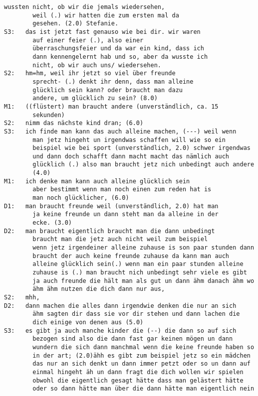 \begin{lstlisting}[language={}]
        wussten nicht, ob wir die jemals wiedersehen, 
        weil (.) wir hatten die zum ersten mal da 
        gesehen. (2.0) Stefanie.
S3:   das ist jetzt fast genauso wie bei dir. wir waren 
        auf einer feier (.), also einer 
        überraschungsfeier und da war ein kind, dass ich 
        dann kennengelernt hab und so, aber da wusste ich 
        nicht, ob wir auch uns/ wiedersehen. 
S2:   hm=hm, weil ihr jetzt so viel über freunde 
        sprecht- (.) denkt ihr denn, dass man alleine
        glücklich sein kann? oder braucht man dazu 
        andere, um glücklich zu sein? (8.0)
M1:   ((flüstert) man braucht andere (unverständlich, ca. 15 
        sekunden)
S2:   nimm das nächste kind dran; (6.0)
S3:   ich finde man kann das auch alleine machen, (---) weil wenn 
        man jetz hingeht un irgendwas schaffen will wie so ein 
        beispiel wie bei sport (unverständlich, 2.0) schwer irgendwas 
        und dann doch schafft dann macht macht das nämlich auch 
        glücklich (.) also man braucht jetz nich unbedingt auch andere 
        (4.0)
M1:   ich denke man kann auch alleine glücklich sein              
        aber bestimmt wenn man noch einen zum reden hat is
        man noch glücklicher, (6.0)
D1:   man braucht freunde weil (unverständlich, 2.0) hat man      
        ja keine freunde un dann steht man da alleine in der
        ecke. (3.0)
D2:   man braucht eigentlich braucht man die dann unbedingt 
        braucht man die jetz auch nicht weil zum beispiel
        wenn jetz irgendeiner alleine zuhause is son paar stunden dann 
        braucht der auch keine freunde zuhause da kann man auch 
        alleine glücklich sein(.) wenn man ein paar stunden alleine 
        zuhause is (.) man braucht nich unbedingt sehr viele es gibt 
        ja auch freunde die hält man als gut un dann ähm danach ähm wo 
        ähm ähm nutzen die dich dann nur aus,
S2:   mhh,
D2:   dann machen die alles dann irgendwie denken die nur an sich 
        ähm sagten dir dass sie vor dir stehen und dann lachen die 
        dich einige von denen aus (5.0)
S3:   es gibt ja auch manche kinder die (--) die dann so auf sich 
        bezogen sind also die dann fast gar keinen mögen un dann 
        wundern die sich dann manchmal wenn die keine freunde haben so  
        in der art; (2.0)ähh es gibt zum beispiel jetz so ein mädchen 
        das nur an sich denkt un dann immer petzt oder so un dann auf 
        einmal hingeht äh un dann fragt die dich wollen wir spielen 
        obwohl die eigentlich gesagt hätte dass man gelästert hätte 
        oder so dann hätte man über die dann hätte man eigentlich nein 

\end{lstlisting}
